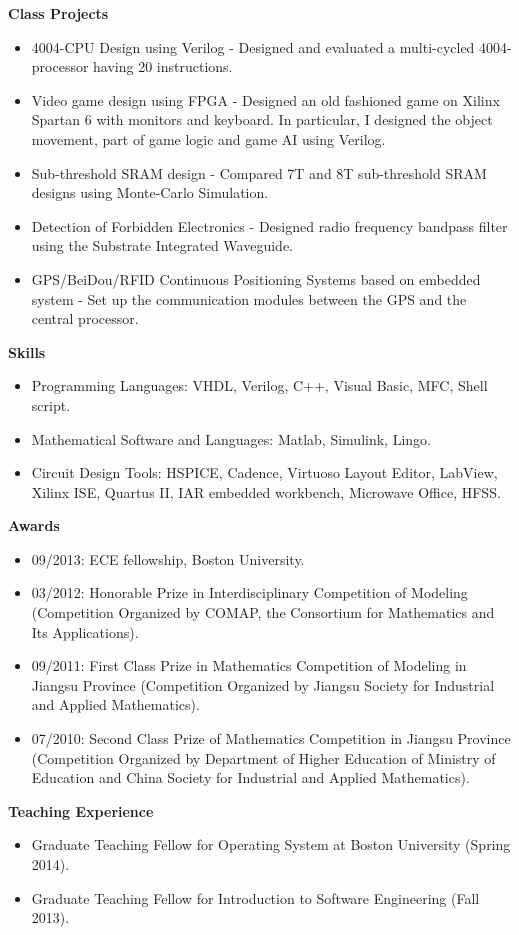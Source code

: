 \documentclass[]{article}
\begin{document}

\noindent \textbf{Class Projects}
\begin{itemize}
\item 4004-CPU Design using Verilog - 
Designed and evaluated a multi-cycled 4004-processor having 20 instructions.

\item Video game design using FPGA - 
Designed an old fashioned game on Xilinx Spartan 6 with monitors and keyboard. In particular, I designed the object movement, part of game logic and game AI using Verilog.

\item Sub-threshold SRAM design - 
Compared 7T and 8T sub-threshold SRAM designs using Monte-Carlo Simulation.
	
\item Detection of Forbidden Electronics -
Designed radio frequency bandpass filter using the Substrate Integrated Waveguide.

\item GPS/BeiDou/RFID Continuous Positioning Systems based on embedded system -
Set up the communication modules between the GPS and the central processor.

\end{itemize}

\noindent \textbf{Skills}
\begin{itemize}
\item Programming Languages: VHDL, Verilog, C++, Visual Basic, MFC, Shell script.
\item Mathematical Software and Languages:  Matlab, Simulink, Lingo.
\item Circuit Design Tools:  HSPICE, Cadence, Virtuoso Layout Editor, 
                                    LabView, Xilinx ISE, Quartus II, 
                                    IAR embedded workbench, Microwave Office,
                                    HFSS.
\end{itemize}
\noindent \textbf{Awards}
\begin{itemize}
\item 09/2013:  ECE fellowship, Boston University.

\item 03/2012:  Honorable Prize in Interdisciplinary Competition of Modeling (Competition Organized by COMAP, the Consortium for Mathematics and Its Applications).

\item 09/2011:  First Class Prize in Mathematics Competition of Modeling in Jiangsu Province (Competition Organized by Jiangsu Society for Industrial and Applied Mathematics).

\item 07/2010:  Second Class Prize of Mathematics Competition in Jiangsu Province (Competition Organized by Department of Higher Education of Ministry of Education and China Society for Industrial and Applied Mathematics).

\end{itemize}

\noindent \textbf{Teaching Experience}
\begin{itemize}
\item Graduate Teaching Fellow for Operating System at Boston University (Spring 2014).
\item Graduate Teaching Fellow for Introduction to Software Engineering (Fall 2013).
\end{itemize}
\end{document}

